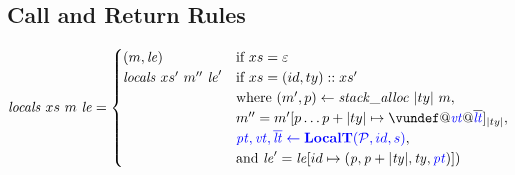 \documentclass[acmsmall,review,anonymous]{acmart}\settopmatter{printfolios=true,printccs=false,printacmref=false}
\begin{document}
\subsection{Call and Return Rules}

\[\mathit{locals} ~ xs ~ \mem ~ \lenv =
\begin{cases}
  (\mem, \lenv) & \textnormal{if } xs = \varepsilon \\
  \mathit{locals} ~ xs' ~ \mem'' ~ \lenv' & \textnormal{if } xs = (id,ty)::xs' \\
  & \textnormal{where } (\mem',p) \leftarrow \mathit{stack\_alloc} ~ |ty| ~ \mem, \\
  & \mem'' = \mem'[p \dots p+|ty| \mapsto \vundef@\vt@\overline{\lt}]_{|ty|}, \\
  & \trule{\localtres}{\localt}, \\
  & \textnormal{and } \lenv' = \lenv[id \mapsto (\mathit{p, p+|ty|,ty,\pt})]) \\
\end{cases}\]

\callstep
\returnstep
\end{document}
